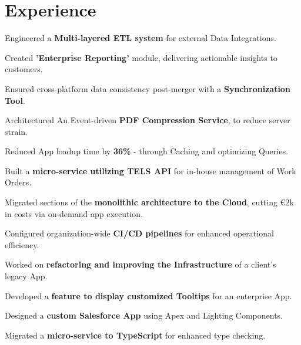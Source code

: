 \documentclass[]{deedy-resume-openfont}
\begin{document}
\begin{minipage}[t]{0.66\textwidth} 

\section{Experience}
\vspace{10pt} %
\begin{tightemize}
\item Engineered a \textbf{Multi-layered ETL system} for external Data Integrations.
\item Created \textbf{'Enterprise Reporting'} module, delivering actionable insights to customers.
\item Ensured cross-platform data consistency post-merger with a \textbf{Synchronization Tool}.
\item Architectured An Event-driven \textbf{PDF Compression Service}, to reduce server strain.
\item Reduced App loadup time by \textbf{36\%} - through Caching and optimizing Queries.
\item Built a \textbf{micro-service utilizing TELS API} for in-house management of Work Orders.
\item Migrated sections of the \textbf{monolithic architecture to the Cloud}, cutting €2k in costs via on-demand app execution.
\item Configured organization-wide \textbf{CI/CD pipelines} for enhanced operational efficiency.
\end{tightemize}
\sectionsep

\begin{tightemize}
\item Worked on \textbf{refactoring and improving the Infrastructure} of a client's legacy App. 
\item Developed a \textbf{feature to display customized Tooltips} for an enterprise App.
\item Designed a \textbf{custom Salesforce App} using Apex and Lighting Components.
\item Migrated a \textbf{micro-service to TypeScript} for enhanced type checking.


\end{tightemize}
\end{minipage}
\end{document}
